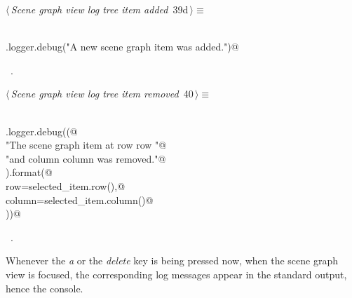 \documentclass[
    a4paper,      %
    10pt,         %
    openright,    %
    notitlepage,  %
    parskip=half, %
]{scrreprt}       %
\theoremstyle{definition}                    %
\begin{document}
\begin{flushleft} \small
\begin{minipage}{\linewidth}\label{scrap51}\raggedright\small
{} $\langle\,${\itshape Scene graph view log tree item added}\nobreak\ {\footnotesize {39d}}$\,\rangle\equiv$
\vspace{-1ex}
\begin{list}{}{} \item
\mbox{}\lstinline@@\\
\mbox{}\lstinline@self.logger.debug("A new scene graph item was added.")@\\
\mbox{}\lstinline@@{\NWsep}
\end{list}
\vspace{-1.5ex}
\footnotesize
\begin{list}{}{\setlength{\itemsep}{-\parsep}\setlength{\itemindent}{-\leftmargin}}
\item \NWtxtMacroRefIn\ .

\item{}
\end{list}
\end{minipage}\vspace{4ex}
\end{flushleft}
\begin{flushleft} \small
\begin{minipage}{\linewidth}\label{scrap52}\raggedright\small
{} $\langle\,${\itshape Scene graph view log tree item removed}\nobreak\ {\footnotesize {40}}$\,\rangle\equiv$
\vspace{-1ex}
\begin{list}{}{} \item
\mbox{}\lstinline@@\\
\mbox{}\lstinline@self.logger.debug((@\\
\mbox{}\lstinline@    "The scene graph item at row {row} "@\\
\mbox{}\lstinline@    "and column {column} was removed."@\\
\mbox{}\lstinline@).format(@\\
\mbox{}\lstinline@    row=selected_item.row(),@\\
\mbox{}\lstinline@    column=selected_item.column()@\\
\mbox{}\lstinline@))@\\
\mbox{}\lstinline@@{\NWsep}
\end{list}
\vspace{-1.5ex}
\footnotesize
\begin{list}{}{\setlength{\itemsep}{-\parsep}\setlength{\itemindent}{-\leftmargin}}
\item \NWtxtMacroRefIn\ .

\item{}
\end{list}
\end{minipage}\vspace{4ex}
\end{flushleft}
Whenever the \textit{a} or the \textit{delete} key is being pressed now, when
the scene graph view is focused, the corresponding log messages appear in the
standard output, hence the console.
\end{document}
